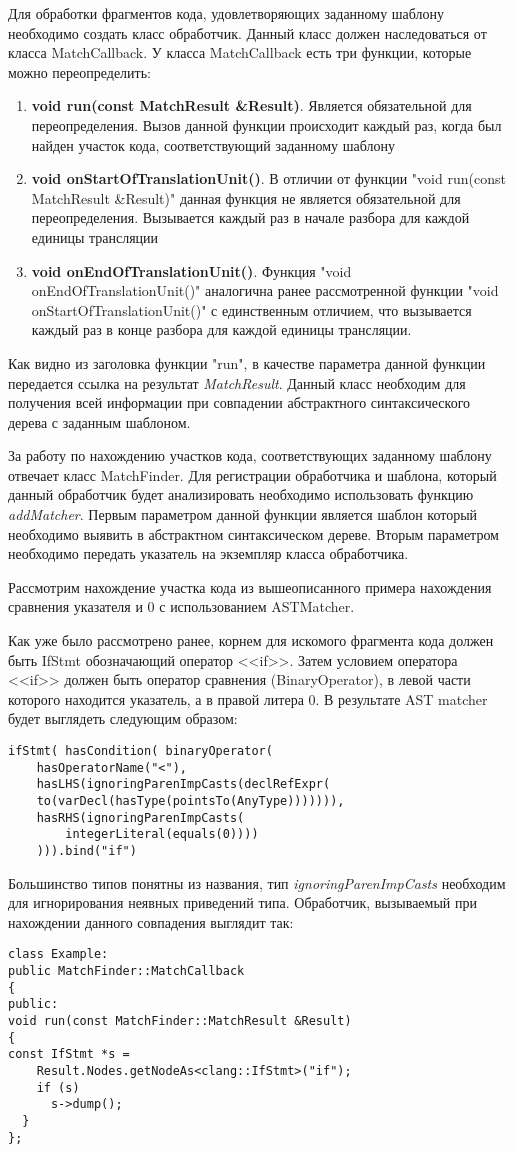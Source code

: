 Для обработки фрагментов кода, удовлетворяющих заданному шаблону необходимо создать класс обработчик.
Данный класс должен наследоваться от класса MatchCallback. У класса MatchCallback есть три функции, 
которые можно переопределить:
\begin{enumerate}
	\item \textbf{void run(const MatchResult \&Result)}. Является обязательной для переопределения.
Вызов данной функции происходит каждый раз, когда был найден участок кода, соответствующий
заданному шаблону
	\item \textbf{void onStartOfTranslationUnit()}. В отличии от функции "void run(const MatchResult \&Result)"
данная функция не является обязательной для переопределения. Вызывается каждый раз в начале
разбора для каждой единицы трансляции
	\item \textbf{void onEndOfTranslationUnit()}. Функция "void onEndOfTranslationUnit()"
аналогична ранее рассмотренной функции "void onStartOfTranslationUnit()" с единственным отличием,
что вызывается каждый раз в конце разбора для каждой единицы трансляции.
\end{enumerate}

Как видно из заголовка функции "run", в качестве параметра данной функции передается ссылка
на результат {\em MatchResult}. Данный класс необходим для получения всей информации при
совпадении абстрактного синтаксического дерева с заданным шаблоном. 

За работу по нахождению участков кода, соответствующих заданному шаблону отвечает класс
MatchFinder. Для регистрации обработчика и шаблона, который данный обработчик будет анализировать
необходимо использовать функцию \textit{addMatcher}. Первым параметром данной функции является 
шаблон который необходимо выявить в абстрактном синтаксическом дереве. Вторым параметром необходимо
передать указатель на экземпляр класса обработчика. 

Рассмотрим нахождение участка кода из вышеописанного примера нахождения сравнения указателя
и 0 с использованием ASTMatcher.

Как уже было рассмотрено ранее, корнем для искомого фрагмента кода должен быть IfStmt обозначающий
оператор <<if>>. Затем условием оператора <<if>> должен быть оператор сравнения (BinaryOperator), 
в левой части которого находится указатель, а в правой литера 0. В результате AST matcher будет
выглядеть следующим образом: 
\begin{lstlisting}
ifStmt( hasCondition( binaryOperator(
	hasOperatorName("<"),
	hasLHS(ignoringParenImpCasts(declRefExpr(
    to(varDecl(hasType(pointsTo(AnyType))))))),
    hasRHS(ignoringParenImpCasts(
    	integerLiteral(equals(0))))
    ))).bind("if")
\end{lstlisting}
Большинство типов понятны из названия, тип {\em ignoringParenImpCasts} необходим для
игнорирования неявных приведений типа. 
Обработчик, вызываемый при нахождении данного совпадения выглядит так:
\begin{lstlisting}
class Example:
public MatchFinder::MatchCallback 
{
public:
void run(const MatchFinder::MatchResult &Result) 
{
const IfStmt *s = 
	Result.Nodes.getNodeAs<clang::IfStmt>("if");
    if (s)
      s->dump();
  }
};
\end{lstlisting}

